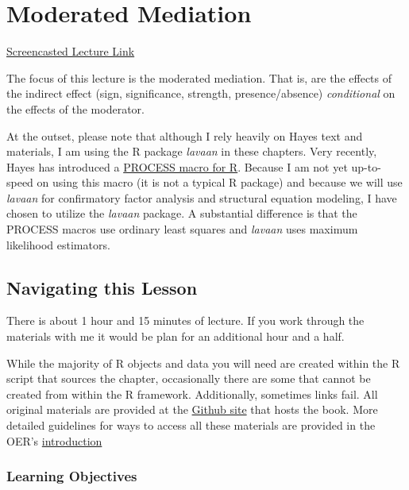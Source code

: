\documentclass[
  11pt,
]{book}
\begin{document}
\hypertarget{ModMed}{%
\chapter{Moderated Mediation}\label{ModMed}}

\href{https://spu.hosted.panopto.com/Panopto/Pages/Viewer.aspx?pid=1d28d076-efad-4471-b52d-ad1601826f92}{Screencasted Lecture Link}

The focus of this lecture is the moderated mediation. That is, are the effects of the indirect effect (sign, significance, strength, presence/absence) \emph{conditional} on the effects of the moderator.

At the outset, please note that although I rely heavily on Hayes \citeyearpar{hayes_introduction_2018} text and materials, I am using the R package \emph{lavaan} in these chapters. Very recently, Hayes has introduced a \href{https://www.processmacro.org/index.html}{PROCESS macro for R}. Because I am not yet up-to-speed on using this macro (it is not a typical R package) and because we will use \emph{lavaan} for confirmatory factor analysis and structural equation modeling, I have chosen to utilize the \emph{lavaan} package. A substantial difference is that the PROCESS macros use ordinary least squares and \emph{lavaan} uses maximum likelihood estimators.

\hypertarget{navigating-this-lesson-7}{%
\section{Navigating this Lesson}\label{navigating-this-lesson-7}}

There is about 1 hour and 15 minutes of lecture. If you work through the materials with me it would be plan for an additional hour and a half.

While the majority of R objects and data you will need are created within the R script that sources the chapter, occasionally there are some that cannot be created from within the R framework. Additionally, sometimes links fail. All original materials are provided at the \href{https://https://github.com/lhbikos/ReC_MultivModel}{Github site} that hosts the book. More detailed guidelines for ways to access all these materials are provided in the OER's \protect\hyperlink{ReCintro}{introduction}

\hypertarget{learning-objectives-7}{%
\subsection{Learning Objectives}\label{learning-objectives-7}}
\end{document}
